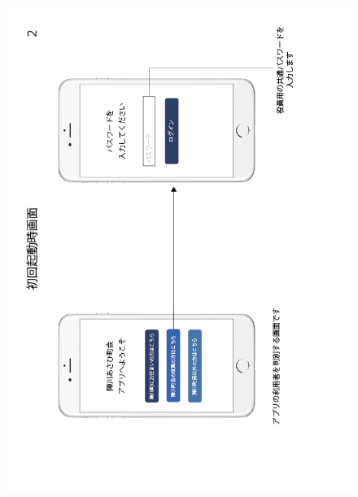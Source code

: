 \begin{figure}[ht]
    \begin{center}
    \includegraphics[keepaspectratio, scale=0.7]{appendixs/appendixB_figres/fig2.png}
    \end{center}
\end{figure}

